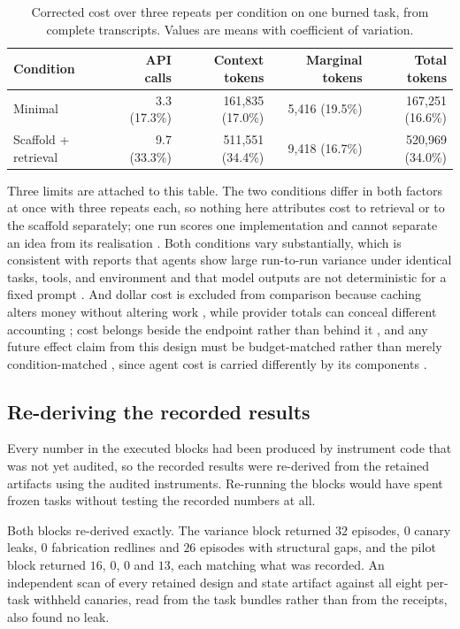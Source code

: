 \documentclass[11pt,a4paper]{article}
\begin{document}
\begin{table}[htbp]
\centering
\caption{Corrected cost over three repeats per condition on one burned task, from
complete transcripts. Values are means with coefficient of variation.}
\label{tab:cost}
\begin{tabular}{lrrrr}
\hline
Condition & API calls & Context tokens & Marginal tokens & Total tokens \\
\hline
Minimal & 3.3 (17.3\%) & 161{,}835 (17.0\%) & 5{,}416 (19.5\%) & 167{,}251 (16.6\%) \\
Scaffold + retrieval & 9.7 (33.3\%) & 511{,}551 (34.4\%) & 9{,}418 (16.7\%) & 520{,}969 (34.0\%) \\
\hline
\end{tabular}
\end{table}

Three limits are attached to this table. The two conditions differ in both factors at
once with three repeats each, so nothing here attributes cost to retrieval or to the
scaffold separately; one run scores one implementation and cannot separate an idea from
its realisation \citep{onerunlottery2026}. Both conditions vary substantially, which is
consistent with reports that agents show large run-to-run variance under identical
tasks, tools, and environment \citep{runvariance2026} and that model outputs are not
deterministic for a fixed prompt \citep{llmrandomness2026}. And dollar cost is excluded
from comparison because caching alters money without altering work
\citep{cachecost2026}, while provider totals can conceal different accounting
\citep{tokenaccounting2026}; cost belongs beside the endpoint rather than behind it
\citep{compressioncost2026}, and any future effect claim from this design must be
budget-matched rather than merely condition-matched \citep{budgetmatched2026}, since
agent cost is carried differently by its components \citep{promptwaste2026}.

\subsection{Re-deriving the recorded results}

Every number in the executed blocks had been produced by instrument code that was not
yet audited, so the recorded results were re-derived from the retained artifacts using
the audited instruments. Re-running the blocks would have spent frozen tasks without
testing the recorded numbers at all.

Both blocks re-derived exactly. The variance block returned $32$ episodes, $0$ canary
leaks, $0$ fabrication redlines and $26$ episodes with structural gaps, and the pilot
block returned $16$, $0$, $0$ and $13$, each matching what was recorded. An independent
scan of every retained design and state artifact against all eight per-task withheld
canaries, read from the task bundles rather than from the receipts, also found no leak.
\end{document}
